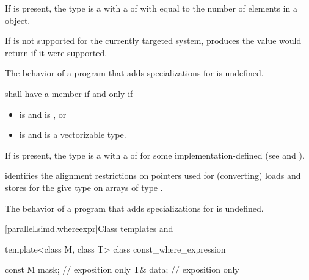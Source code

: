 \begin{itemdescr}
\begin{itemdescr}
\begin{itemdescr}
\pnum
If  is present, the type  is a  with a  of  with  equal to the number of elements in a  object. \begin{note}If  is not supported for the currently targeted system,  produces the value  would return if it were supported.\end{note}

\pnum
The behavior of a program that adds specializations for  is undefined.
\end{itemdescr}

\begin{itemdecl}
\end{itemdecl}
\begin{itemdescr}
\pnum
{} shall have a member  if and only if
\begin{itemize}
  \item {} is  and  is , or
  \item {} is  and  is a vectorizable type.
\end{itemize}

\pnum
If  is present, the type  is a  with a  of  for some implementation-defined  (see  and ). \begin{note} identifies the alignment restrictions on pointers used for (converting) loads and stores for the give type  on arrays of type .\end{note}

\pnum
The behavior of a program that adds specializations for  is undefined.
\end{itemdescr}

[parallel.simd.whereexpr]{Class templates  and }

\begin{codeblock}
  template<class M, class T> class const_where_expression {
    const M mask; // exposition only
    T& data; // exposition only

}
\end{codeblock}
\end{itemdescr}
\end{itemdescr}
